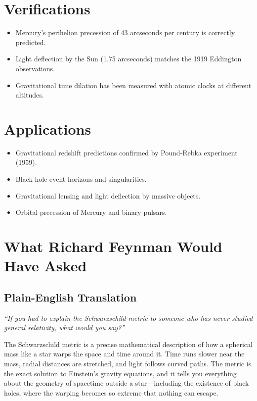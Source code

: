 \documentclass[11pt,openright]{book}
\begin{document}
\section*{Verifications}

\begin{itemize}
    \item Mercury's perihelion precession of 43 arcseconds per century is correctly predicted.
    \item Light deflection by the Sun (1.75 arcseconds) matches the 1919 Eddington observations.
    \item Gravitational time dilation has been measured with atomic clocks at different altitudes.
\end{itemize}
\section*{Applications}

\begin{itemize}
    \item Gravitational redshift predictions confirmed by Pound-Rebka experiment (1959).
    \item Black hole event horizons and singularities.
    \item Gravitational lensing and light deflection by massive objects.
    \item Orbital precession of Mercury and binary pulsars.
\end{itemize}
\section*{What Richard Feynman Would Have Asked}

\subsection*{Plain-English Translation}
\textit{``If you had to explain the Schwarzschild metric to someone who has never studied general relativity, what would you say?''}

The Schwarzschild metric is a precise mathematical description of how a spherical mass like a star warps the space and time around it. Time runs slower near the mass, radial distances are stretched, and light follows curved paths. The metric is the exact solution to Einstein's gravity equations, and it tells you everything about the geometry of spacetime outside a star---including the existence of black holes, where the warping becomes so extreme that nothing can escape.
\end{document}
